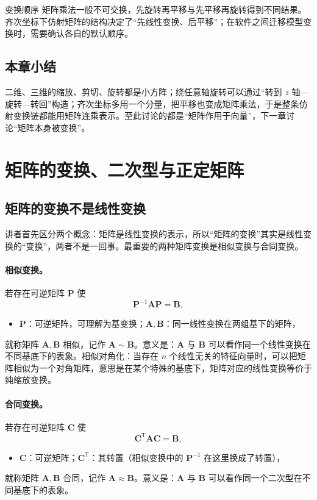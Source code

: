 \documentclass[a4paper]{article}
\begin{document}
\begin{warningbox}{变换顺序}
矩阵乘法一般不可交换，先旋转再平移与先平移再旋转得到不同结果。齐次坐标下仿射矩阵的结构决定了“先线性变换、后平移”；在软件之间迁移模型变换时，需要确认各自的默认顺序。
\end{warningbox}

\subsection{本章小结}

二维、三维的缩放、剪切、旋转都是小方阵；绕任意轴旋转可以通过“转到 $z$ 轴—旋转—转回”构造；齐次坐标多用一个分量，把平移也变成矩阵乘法，于是整条仿射变换链都能用矩阵连乘表示。至此讨论的都是“矩阵作用于向量”，下一章讨论“矩阵本身被变换”。

\section{矩阵的变换、二次型与正定矩阵}

\subsection{矩阵的变换不是线性变换}

讲者首先区分两个概念：矩阵是线性变换的表示，所以“矩阵的变换”其实是线性变换的“变换”，两者不是一回事。最重要的两种矩阵变换是相似变换与合同变换。

\paragraph{相似变换。}若存在可逆矩阵 $\boldsymbol P$ 使
\[
\boldsymbol P^{-1}\boldsymbol A\boldsymbol P=\boldsymbol B ,
\]
\begin{itemize}
\item $\boldsymbol P$：可逆矩阵，可理解为基变换；$\boldsymbol A,\boldsymbol B$：同一线性变换在两组基下的矩阵，
\end{itemize}
就称矩阵 $\boldsymbol A,\boldsymbol B$ 相似，记作 $\boldsymbol A\sim\boldsymbol B$。意义是：$\boldsymbol A$ 与 $\boldsymbol B$ 可以看作同一个线性变换在不同基底下的表象。相似对角化：当存在 $n$ 个线性无关的特征向量时，可以把矩阵相似为一个对角矩阵，意思是在某个特殊的基底下，矩阵对应的线性变换等价于纯缩放变换。

\paragraph{合同变换。}若存在可逆矩阵 $\boldsymbol C$ 使
\[
\boldsymbol C^{\mathsf T}\boldsymbol A\boldsymbol C=\boldsymbol B ,
\]
\begin{itemize}
\item $\boldsymbol C$：可逆矩阵；$\boldsymbol C^{\mathsf T}$：其转置（相似变换中的 $\boldsymbol P^{-1}$ 在这里换成了转置），
\end{itemize}
就称矩阵 $\boldsymbol A,\boldsymbol B$ 合同，记作 $\boldsymbol A\approx\boldsymbol B$。意义是：$\boldsymbol A$ 与 $\boldsymbol B$ 可以看作同一个二次型在不同基底下的表象。
\end{document}
